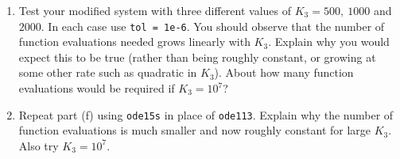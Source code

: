 \begin{enumerate}
\item Test your modified system with three different values of $K_3 =
500,~1000$ and $2000$.  In each case use {\tt tol = 1e-6}.  You should
observe that the number of function evaluations needed grows linearly with
$K_3$.  Explain why you would expect this to be true (rather than being
roughly constant, or growing at some other rate such as quadratic in $K_3$).
About how many function evaluations would be required if $K_3 = 10^7$?

\item Repeat part (f) using {\tt ode15s} in place of {\tt ode113}.
Explain why the number of function evaluations is much smaller and now
roughly constant for large $K_3$.  Also try $K_3=10^7$.
\end{enumerate} 
